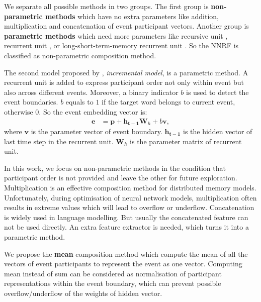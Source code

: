 \documentclass[a4paper]{article}
\begin{document}
We separate all possible methods in two groups. The first group is \textbf{non-parametric methods} which have no extra parameters like addition, multiplication and concatenation of event participant vectors. Another group is \textbf{parametric methods} which need more parameters like recursive unit \citep{socher2013recursive}, recurrent unit \citet{mikolov2010recurrent}, or long-short-term-memory recurrent unit \citep{hochreiter1997LSTM}. So the NNRF is classified as non-parametric composition method. 

The second model proposed by \citet{tilk2016event}, \textit{incremental model}, is a parametric method. A recurrent unit is added to express participant order not only within event but also across different events. Moreover, a binary indicator $b$ is used to detect the event boundaries. $b$ equals to $1$ if the target word belongs to current event, otherwise $0$. So the event embedding vector is: 
\begin{equation} \label{eq:incremental}
\begin{aligned}
    \mathbf{e} 
        &= \mathbf{p} + \mathbf{h_{t-1}}\mathbf{W}_h + b\mathbf{v}, 
\end{aligned}
\end{equation}
where $\mathbf{v}$ is the parameter vector of event boundary. $\mathbf{h_{t-1}}$ is the hidden vector of last time step in the recurrent unit. $\mathbf{W}_h$ is the parameter matrix of recurrent unit. 

In this work, we focus on non-parametric methods in the condition that participant order is not provided and leave the other for future exploration. Multiplication is an effective composition method for distributed memory models. Unfortunately, during optimisation of neural network models, multiplication often results in extreme values which will lead to overflow or underflow. Concatenation is widely used in language modelling. But usually the concatenated feature can not be used directly. An extra feature extractor is needed, which turns it into a parametric method. 

We propose the \textbf{mean} composition method which compute the mean of all the  vectors of event participants to represent the event as one vector. Computing mean instead of sum can be considered as normalisation of participant representations within the event boundary, which can prevent possible overflow/underflow of the weights of hidden vector. 
\end{document}
